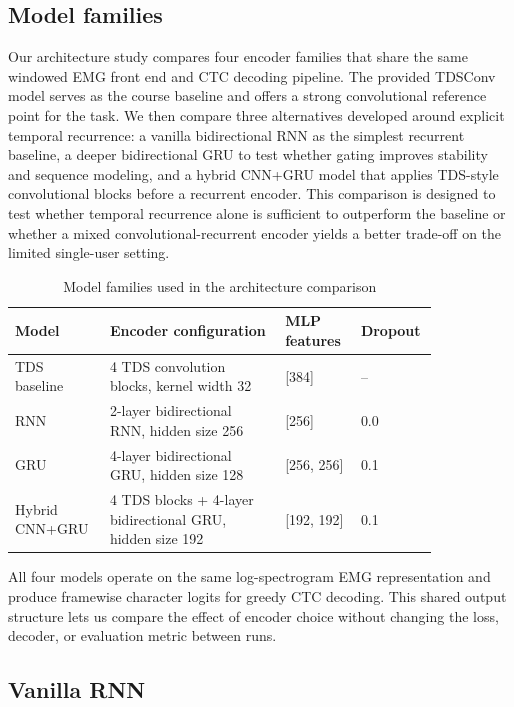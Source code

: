\documentclass{article}
\begin{document}
\subsection{Model families}

Our architecture study compares four encoder families that share the same
windowed EMG front end and CTC decoding pipeline. The provided TDSConv model
serves as the course baseline and offers a strong convolutional reference point
for the task. We then compare three alternatives developed around explicit
temporal recurrence: a vanilla bidirectional RNN as the simplest recurrent
baseline, a deeper bidirectional GRU to test whether gating improves stability
and sequence modeling, and a hybrid CNN+GRU model that applies TDS-style
convolutional blocks before a recurrent encoder. This comparison is designed to
test whether temporal recurrence alone is sufficient to outperform the baseline
or whether a mixed convolutional-recurrent encoder yields a better trade-off on
the limited single-user setting.

\begin{table}[t]
	\caption{Model families used in the architecture comparison}
	\label{tab:architecture-config}
	\centering
	\begin{tabular}{p{0.20\linewidth}p{0.38\linewidth}p{0.16\linewidth}p{0.10\linewidth}}
		\toprule
		Model          & Encoder configuration                                     & MLP features & Dropout \\
		\midrule
		TDS baseline   & 4 TDS convolution blocks, kernel width 32                 & [384]        & --      \\
		RNN            & 2-layer bidirectional RNN, hidden size 256                & [256]        & 0.0     \\
		GRU            & 4-layer bidirectional GRU, hidden size 128                & [256, 256]   & 0.1     \\
		Hybrid CNN+GRU & 4 TDS blocks + 4-layer bidirectional GRU, hidden size 192 & [192, 192]   & 0.1     \\
		\bottomrule
	\end{tabular}
\end{table}

All four models operate on the same log-spectrogram EMG representation and
produce framewise character logits for greedy CTC decoding. This shared output
structure lets us compare the effect of encoder choice without changing the
loss, decoder, or evaluation metric between runs.

\subsection{Vanilla RNN}
\end{document}
